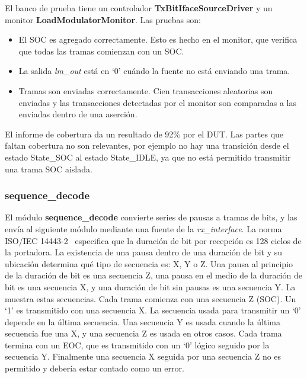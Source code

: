 \documentclass[a4paper, twoside, 11pt]{report}
\begin{document}
El banco de prueba tiene un controlador \textbf{TxBitIfaceSourceDriver} y un monitor \textbf{LoadModulatorMonitor}. Las pruebas son:

\begin{itemize}
  \item El SOC es agregado correctamente. Esto es hecho en el monitor, que verifica que todas las tramas comienzan con un SOC.
  \item La salida \textit{lm\_out} está en ‘0’ cuándo la fuente no está enviando una trama.
  \item Tramas son enviadas correctamente. Cien transacciones aleatorias son enviadas y las transacciones detectadas por el monitor son comparadas a las enviadas dentro de una aserción.
\end{itemize}

El informe de cobertura da un resultado de 92\% por el DUT. Las partes que faltan cobertura no son relevantes, por ejemplo no hay una transición desde el estado State\_SOC al estado State\_IDLE, ya que no está permitido transmitir una trama SOC aislada.

\FloatBarrier
\subsubsection{sequence\_decode}
\label{sec:sequence_decode}

El módulo \textbf{sequence\_decode} convierte series de pausas a tramas de bits, y las envía al siguiente módulo mediante una fuente de la \textit{rx\_interface}. La norma ISO/IEC 14443-2~\cite{iso14443-2} especifica que la duración de bit por recepción es 128 ciclos de la portadora. La existencia de una pausa dentro de una duración de bit y su ubicación determina qué tipo de secuencia es: X, Y o Z. Una pausa al principio de la duración de bit es una secuencia Z, una pausa en el medio de la duración de bit es una secuencia X, y una duración de bit sin pausas es una secuencia Y.  La  muestra estas secuencias. Cada trama comienza con una secuencia Z (SOC). Un ‘1’ es transmitido con una secuencia X. La secuencia usada para transmitir un ‘0’ depende en la última secuencia. Una secuencia Y es usada cuando la última secuencia fue una X, y una secuencia Z es usada en otros casos. Cada trama termina con un EOC, que es transmitido con un ‘0’ lógico seguido por la secuencia Y. Finalmente una secuencia X seguida por una secuencia Z no es permitido y debería estar contado como un error.
\end{document}
